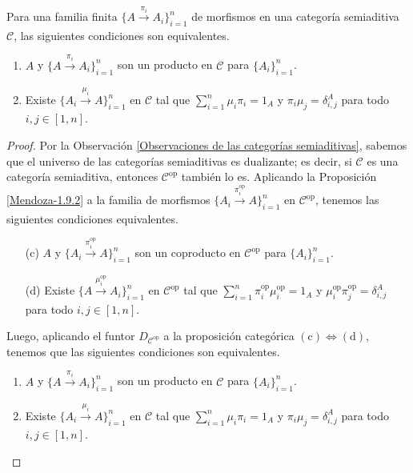 \documentclass[tesis]{subfiles}
\begin{document}
\begin{Prop}\label{Mendoza-Ejer.43}
    Para una familia finita $\{A\xrightarrow[]{\pi_i} A_i\}_{i=1}^n$ de morfismos en una categoría semiaditiva $\mathscr{C}$, las siguientes condiciones son equivalentes.

    \begin{enumerate}[label=(\alph*)]

        \item $A$ y $\{A\xrightarrow[]{\pi_i} A_i\}_{i=1}^n$ son un producto en $\mathscr{C}$ para $\{A_i\}_{i=1}^n$.

        \item Existe $\{A_i\xrightarrow[]{\mu_i} A\}_{i=1}^n$ en $\mathscr{C}$ tal que $\sum_{i=1}^n \mu_i\pi_i = 1_A$ y $\pi_i\mu_j = \delta_{i,j}^A$ para todo $i,j\in[1,n]$.
    \end{enumerate}
\end{Prop}

\begin{proof}
    Por la Observación \ref{Observaciones de las categorías semiaditivas}, sabemos que el universo de las categorías semiaditivas es dualizante; es decir, si $\mathscr{C}$ es una categoría semiaditiva, entonces $\mathscr{C}^{\text{op}}$ también lo es. Aplicando la Proposición \ref{Mendoza-1.9.2} a la familia de morfismos $\{A_i\xrightarrow[]{\pi_i^{\text{op}}} A\}_{i=1}^n$ en $\mathscr{C}^{\text{op}}$, tenemos las siguientes condiciones equivalentes.

    \begin{enumerate}

        \item[(c)] $A$ y $\{A_i\xrightarrow[]{\pi_i^{\text{op}}} A\}_{i=1}^n$ son un coproducto en $\mathscr{C}^{\text{op}}$ para $\{A_i\}_{i=1}^n$.

        \item[(d)] Existe $\{A\xrightarrow[]{\mu_i^{\text{op}}} A_i\}_{i=1}^n$ en $\mathscr{C}^{\text{op}}$ tal que $\sum_{i=1}^n \pi_i^{\text{op}}\mu_i^{\text{op}} = 1_A$ y $\mu_i^{\text{op}}\pi_j^{\text{op}} = \delta_{i,j}^A$ para todo $i,j\in[1,n]$.
    \end{enumerate}

    \noindent Luego, aplicando el funtor $D_{\mathscr{C}^\text{op}}$ a la proposición categórica $(\text{c})\Leftrightarrow(\text{d})$, tenemos que las siguientes condiciones son equivalentes.
    \begin{enumerate}[label=(\alph*)]

        \item $A$ y $\{A\xrightarrow[]{\pi_i} A_i\}_{i=1}^n$ son un producto en $\mathscr{C}$ para $\{A_i\}_{i=1}^n$.

        \item Existe $\{A_i\xrightarrow[]{\mu_i} A\}_{i=1}^n$ en $\mathscr{C}$ tal que $\sum_{i=1}^n \mu_i\pi_i = 1_A$ y $\pi_i\mu_j = \delta_{i,j}^A$ para todo $i,j\in[1,n]$.
    \end{enumerate}
\end{proof}
\end{document}
